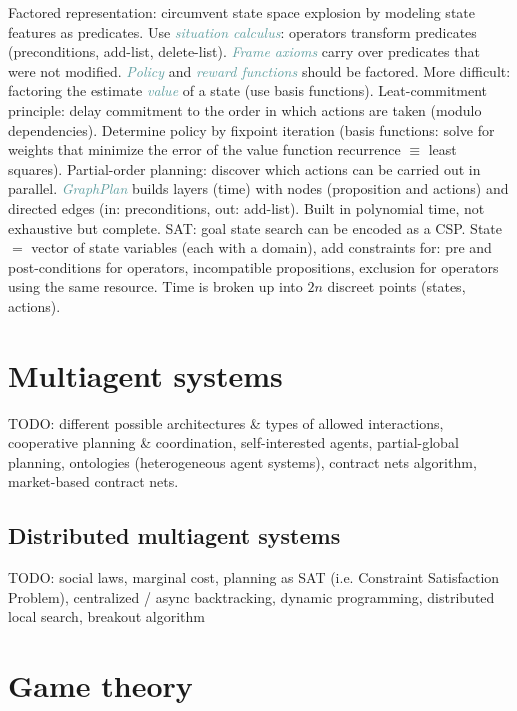\documentclass[10pt,a4paper,landscape]{article}
\newcommand{\concept}[1]{\textcolor{Emerald}{#1}} %
\newcommand{\subconcept}[1]{\textcolor{CadetBlue}{\textit{#1}}}
\begin{document}
\begin{multicols*}{4}
\concept{Factored representation}: circumvent state space explosion by modeling state features as predicates. Use \subconcept{situation calculus}: operators transform predicates (preconditions, add-list, delete-list). \subconcept{Frame axioms} carry over predicates that were not modified.
\subconcept{Policy} and \subconcept{reward functions} should be factored. More difficult: factoring the estimate \subconcept{value} of a state (use basis functions).
\concept{Leat-commitment principle}: delay commitment to the order in which actions are taken (modulo dependencies). Determine policy by fixpoint iteration (basis functions: solve for weights that minimize the error of the value function recurrence $\equiv$ least squares).
\concept{Partial-order planning}: discover which actions can be carried out in parallel.
\subconcept{GraphPlan} builds layers (time) with nodes (proposition and actions) and directed edges (in: preconditions, out: add-list). Built in polynomial time, not exhaustive but complete.
\concept{SAT}: goal state search can be encoded as a CSP. State $=$ vector of state variables (each with a domain), add constraints for: pre and post-conditions for operators, incompatible propositions, exclusion for operators using the same resource. Time is broken up into $2n$ discreet points (states, actions).

\section{Multiagent systems}

TODO: different possible architectures \& types of allowed interactions, cooperative planning \& coordination, self-interested agents, partial-global planning, ontologies (heterogeneous agent systems), contract nets algorithm, market-based contract nets.

\subsection{Distributed multiagent systems}

TODO: social laws, marginal cost, planning as SAT (i.e. Constraint Satisfaction Problem), centralized / async backtracking, dynamic programming, distributed local search, breakout algorithm

\section{Game theory}


\end{multicols*}
\end{document}
